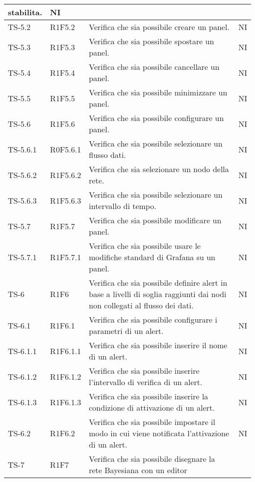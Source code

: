 \begin{longtable}{|C{2.5cm}|C{2.5cm}|C{6.5cm}|C{1.5cm}|}
			stabilita. & {NI}\\
			\hline
			{TS-5.2} & {R1F5.2} & Verifica che sia possibile creare un panel. & {NI}\\
			\hline
			{TS-5.3} & {R1F5.3} & Verifica che sia possibile spostare un
			panel. & {NI}\\
			\hline
			{TS-5.4} & {R1F5.4} & Verifica che sia possibile cancellare un
			panel. & {NI}\\
			\hline
			{TS-5.5} & {R1F5.5} & Verifica che sia possibile minimizzare un
			panel. & {NI}\\
			\hline
			{TS-5.6} & {R1F5.6} & Verifica che sia possibile configurare un
			panel. & {NI}\\
			\hline
			{TS-5.6.1} & {R0F5.6.1} & Verifica che sia possibile selezionare un
			flusso dati. & {NI}\\
			{TS-5.6.2} & {R1F5.6.2} & Verifica che sia selezionare un
			nodo della rete. & {NI}\\
			\hline
			{TS-5.6.3} & {R1F5.6.3} & Verifica che sia possibile selezionare un
			intervallo di tempo.  & {NI}\\
			\hline
			{TS-5.7} & {R1F5.7} & Verifica che sia possibile modificare un
			panel.  & {NI}\\
			\hline
			{TS-5.7.1} & {R1F5.7.1} & Verifica che sia possibile usare le
			modifiche standard di Grafana su un
			panel.
  & {NI}\\
			\hline
			{TS-6} & {R1F6} & Verifica che sia  possibile definire alert in
			base a livelli di soglia raggiunti dai
			nodi non collegati al flusso dei dati.  & {NI}\\
			\hline
			{TS-6.1} & {R1F6.1} & Verifica che sia possibile configurare i
			parametri di un alert.  & {NI}\\
			\hline
			{TS-6.1.1} & {R1F6.1.1} & Verifica che sia possibile inserire il nome
			di un alert.  & {NI}\\
			\hline
			{TS-6.1.2} & {R1F6.1.2} & Verifica che sia  possibile inserire
			l'intervallo di verifica di un alert.  & {NI}\\
			\hline
			{TS-6.1.3} & {R1F6.1.3} & Verifica che sia possibile inserire la
			condizione di attivazione di un alert.  & {NI}\\
			\hline
			{TS-6.2} & {R1F6.2} & Verifica che sia possibile impostare il
			modo in cui viene notificata
			l'attivazione di un alert.  & {NI}\\
			\hline
			{TS-7} & {R1F7} & Verifica che sia possibile disegnare la rete
			Bayesiana con un editor

\end{longtable}
